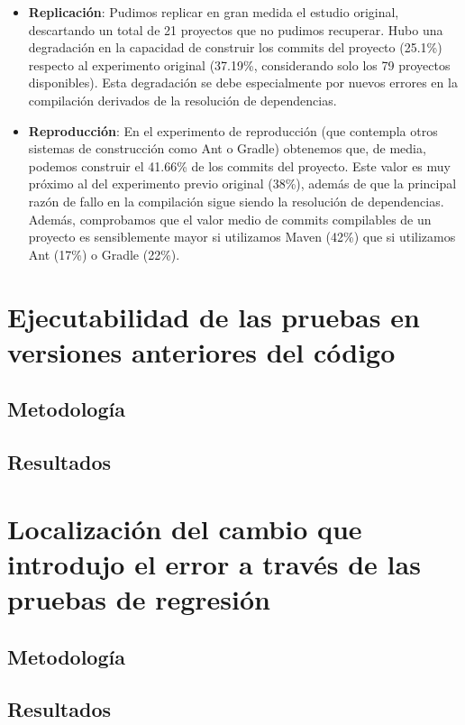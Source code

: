 \begin{itemize}
    \item \textbf{Replicación}: Pudimos replicar en gran medida el estudio original, descartando un total de 21 proyectos que no pudimos recuperar. 
    Hubo una degradación en la capacidad de construir los commits del proyecto (25.1\%) respecto al experimento original (37.19\%, considerando solo los 79 proyectos disponibles). Esta degradación se debe especialmente por nuevos errores en la compilación derivados de la resolución de dependencias.
    \item \textbf{Reproducción}: En el experimento de reproducción (que contempla otros sistemas de construcción como Ant o Gradle) obtenemos que, de media, podemos construir el 41.66\% de los commits del proyecto. Este valor es muy próximo al del experimento previo original (38\%), además de que la principal razón de fallo en la compilación sigue siendo la resolución de dependencias. Además, comprobamos que el valor medio de commits compilables de un proyecto es sensiblemente mayor si utilizamos Maven (42\%) que si utilizamos Ant (17\%) o Gradle (22\%).
\end{itemize}

\section{Ejecutabilidad de las pruebas en versiones anteriores del código}
\label{sec:resumen:testability}

\subsection{Metodología}

\subsection{Resultados}

\section{Localización del cambio que introdujo el error a través de las pruebas de regresión}
\label{sec:resumen:bug-hunter}

\subsection{Metodología}

\subsection{Resultados}

